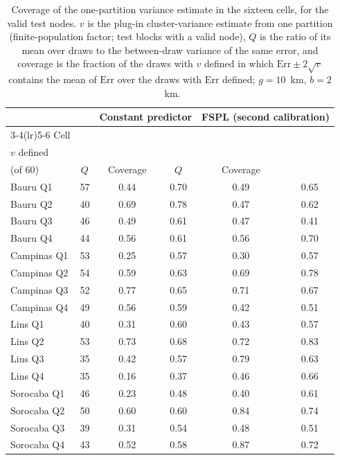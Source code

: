 \begin{table}[H]
\caption{Coverage of the one-partition variance estimate in the sixteen cells, for the valid test nodes. $v$ is the plug-in cluster-variance estimate from one partition (finite-population factor; test blocks with a valid node), $Q$ is the ratio of its mean over draws to the between-draw variance of the same error, and coverage is the fraction of the draws with $v$ defined in which $\mathrm{Err} \pm 2\sqrt{v}$ contains the mean of $\mathrm{Err}$ over the draws with $\mathrm{Err}$ defined; $g = 10$~km, $b = 2$~km.}
\label{tab:coverage_one_partition}
\centering
\begin{tabular}{lccccc}
\toprule
 & & \multicolumn{2}{c}{Constant predictor} & \multicolumn{2}{c}{FSPL (second calibration)} \\
\cmidrule(lr){3-4}\cmidrule(lr){5-6}
Cell & \celula{Draws with \\ \relax $v$ defined \\ \relax (of 60)} & $Q$ & Coverage & $Q$ & Coverage \\
\midrule
Bauru Q1 & 57 & 0.44 & 0.70 & 0.49 & 0.65 \\
Bauru Q2 & 40 & 0.69 & 0.78 & 0.47 & 0.62 \\
Bauru Q3 & 46 & 0.49 & 0.61 & 0.47 & 0.41 \\
Bauru Q4 & 44 & 0.56 & 0.61 & 0.56 & 0.70 \\
\midrule
Campinas Q1 & 53 & 0.25 & 0.57 & 0.30 & 0.57 \\
Campinas Q2 & 54 & 0.59 & 0.63 & 0.69 & 0.78 \\
Campinas Q3 & 52 & 0.77 & 0.65 & 0.71 & 0.67 \\
Campinas Q4 & 49 & 0.56 & 0.59 & 0.42 & 0.51 \\
\midrule
Lins Q1 & 40 & 0.31 & 0.60 & 0.43 & 0.57 \\
Lins Q2 & 53 & 0.73 & 0.68 & 0.72 & 0.83 \\
Lins Q3 & 35 & 0.42 & 0.57 & 0.79 & 0.63 \\
Lins Q4 & 35 & 0.16 & 0.37 & 0.46 & 0.66 \\
\midrule
Sorocaba Q1 & 46 & 0.23 & 0.48 & 0.40 & 0.61 \\
Sorocaba Q2 & 50 & 0.60 & 0.60 & 0.84 & 0.74 \\
Sorocaba Q3 & 39 & 0.31 & 0.54 & 0.48 & 0.51 \\
Sorocaba Q4 & 43 & 0.52 & 0.58 & 0.87 & 0.72 \\
\bottomrule
\end{tabular}
\end{table}

